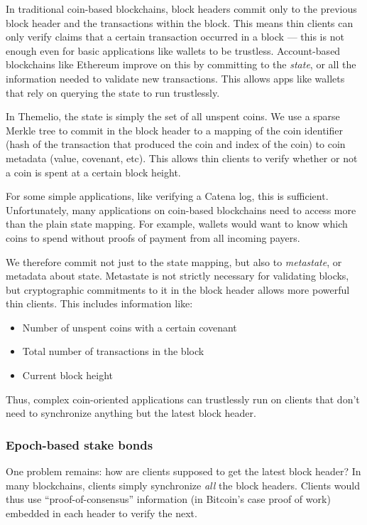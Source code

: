 \documentclass[headinclude,12pt]{scrbook}
\begin{document}
In traditional coin-based blockchains, block headers commit only to the previous block header and the transactions within the block. This means thin clients can only verify claims that a certain transaction occurred in a block --- this is not enough even for basic applications like wallets to be trustless. Account-based blockchains like Ethereum improve on this by committing to the \textit{state}, or all the information needed to validate new transactions. This allows apps like wallets that rely on querying the state to run trustlessly.

In Themelio, the state is simply the set of all unspent coins. We use a sparse Merkle tree to commit in the block header to a mapping of the coin identifier (hash of the transaction that produced the coin and index of the coin) to coin metadata (value, covenant, etc). This allows thin clients to verify whether or not a coin is spent at a certain block height.

For some simple applications, like verifying a Catena log, this is sufficient. Unfortunately, many applications on coin-based blockchains need to access more than the plain state mapping. For example, wallets would want to know which coins to spend without proofs of payment from all incoming payers.

We therefore commit not just to the state mapping, but also to \textit{metastate}, or metadata about state. Metastate is not strictly necessary for validating blocks, but cryptographic commitments to it in the block header allows more powerful thin clients. This includes information like:
\begin{itemize}
    \item Number of unspent coins with a certain covenant
    \item Total number of transactions in the block
    \item Current block height
\end{itemize}

Thus, complex coin-oriented applications can trustlessly run on clients that don't need to synchronize anything but the latest block header.

\subsubsection{Epoch-based stake bonds}

One problem remains: how are clients supposed to get the latest block header? In many blockchains, clients simply synchronize \emph{all} the block headers. Clients would thus use ``proof-of-consensus'' information (in Bitcoin's case proof of work) embedded in each header to verify the next.
\end{document}
